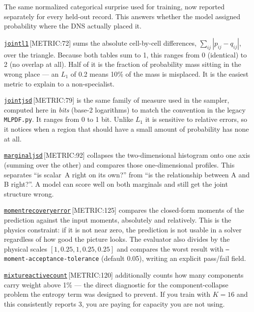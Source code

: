 \documentclass[11pt,a4paper]{report}
\newcommand{\srcbase}{vscode://file/Users/syellapa/Documents/Research/2026/ANSYS/Multi-ScalarPDF}
\newcommand{\dmdn}{dirichlet\string_mdn}
\newcommand{\srctag}[1]{{\footnotesize\textcolor{TagGray}{[#1]}}}
\newcommand{\Metric}[2]{\href{\srcbase/\dmdn/metrics.py:#1}{\texttt{#2}}\,\srctag{METRIC:#1}}
\newcommand{\code}[1]{\texttt{#1}}
\renewcommand{\_}{\origtextunderscore\allowbreak}
\begin{document}
\begin{description}[leftmargin=1.6cm, style=nextline]
  \item[Test negative log-likelihood] The same normalized categorical surprise used for
        training, now reported separately for every held-out record. This answers whether
        the model assigned probability where the DNS actually placed it.
  \item[$L_1$ error] \Metric{72}{joint\_l1} sums the absolute cell-by-cell differences,
        $\sum_{ij} |p_{ij} - q_{ij}|$, over the triangle. Because both tables sum to 1, this
        ranges from 0 (identical) to 2 (no overlap at all). Half of it is the fraction of
        probability mass sitting in the wrong place --- an $L_1$ of 0.2 means 10\% of the mass
        is misplaced. It is the easiest metric to explain to a non-specialist.
  \item[Jensen--Shannon divergence] \Metric{79}{joint\_jsd} is the same family of measure used
        in the sampler, computed here in \emph{bits} (base-2 logarithms) to match the
        convention in the legacy \code{MLPDF.py}. It ranges from 0 to 1 bit. Unlike $L_1$ it is
        sensitive to relative errors, so it notices when a region that should have a small
        amount of probability has none at all.
  \item[Marginal divergences] \Metric{92}{marginal\_jsd} collapses the two-dimensional
        histogram onto one axis (summing over the other) and compares those one-dimensional
        profiles. This separates ``is scalar~A right on its own?'' from ``is the relationship
        between A and B right?''. A model can score well on both marginals and still get the
        joint structure wrong.
  \item[Moment recovery error] \Metric{125}{moment\_recovery\_error} compares the closed-form
        moments of the prediction against the input moments, absolutely and relatively. This is
        the physics constraint: if it is not near zero, the prediction is not usable in a solver
        regardless of how good the picture looks. The evaluator also divides by the physical
        scales $[1,0.25,1,0.25,0.25]$ and compares the worst result with
        \code{--moment-acceptance-tolerance} (default 0.05), writing an explicit pass/fail field.
\end{description}

\Metric{120}{mixture\_active\_count} additionally counts how many components carry weight above
1\% --- the direct diagnostic for the component-collapse problem the entropy term was designed
to prevent. If you train with $K = 16$ and this consistently reports 3, you are paying for
capacity you are not using.
\end{document}
